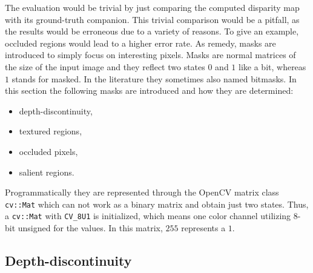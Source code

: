 The evaluation would be trivial by just comparing the computed disparity map with its ground-truth companion.
This trivial comparison would be a pitfall, as the results would be erroneous due to a variety of reasons.
To give an example, occluded regions would lead to a higher error rate.
As remedy, masks are introduced to simply focus on interesting pixels.
Masks are normal matrices of the size of the input image and they reflect two states $0$ and $1$ like a bit, whereas $1$ stands for masked.
In the literature they sometimes also named bitmasks.
In this section the following masks are introduced and how they are determined:

\begin{itemize}
  \item depth-discontinuity,
  \item textured regions,
  \item occluded pixels,
  \item salient regions.
\end{itemize}

\noindent Programmatically they are represented through the OpenCV matrix class \texttt{cv::Mat} which can not work as a binary matrix and obtain just two states.
Thus, a \texttt{cv::Mat} with \texttt{CV\_8U1} is initialized, which means one color channel utilizing 8-bit unsigned for the values.
In this matrix, $255$ represents a $1$.

\subsection*{Depth-discontinuity}

